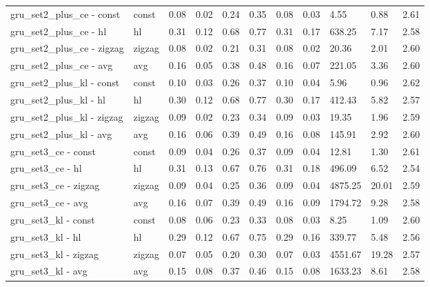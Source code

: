 \begin{longtable}{|p{1.3cm}|p{1.3cm}|p{1.3cm}|p{1.3cm}|p{1.3cm}|p{1.3cm}|p{1.3cm}|p{1.3cm}|p{1.3cm}|p{1.3cm}|p{1.3cm}|}
gru_set2_plus_ce - const & const & 0.08 & 0.02 & 0.24 & 0.35 & 0.08 & 0.03 & 4.55 & 0.88 & 2.61 \\
gru_set2_plus_ce - hl & hl & 0.31 & 0.12 & 0.68 & 0.77 & 0.31 & 0.17 & 638.25 & 7.17 & 2.58 \\
gru_set2_plus_ce - zigzag & zigzag & 0.08 & 0.02 & 0.21 & 0.31 & 0.08 & 0.02 & 20.36 & 2.01 & 2.60 \\
gru_set2_plus_ce - avg & avg & 0.16 & 0.05 & 0.38 & 0.48 & 0.16 & 0.07 & 221.05 & 3.36 & 2.60 \\
gru_set2_plus_kl - const & const & 0.10 & 0.03 & 0.26 & 0.37 & 0.10 & 0.04 & 5.96 & 0.96 & 2.62 \\
gru_set2_plus_kl - hl & hl & 0.30 & 0.12 & 0.68 & 0.77 & 0.30 & 0.17 & 412.43 & 5.82 & 2.57 \\
gru_set2_plus_kl - zigzag & zigzag & 0.09 & 0.02 & 0.23 & 0.34 & 0.09 & 0.03 & 19.35 & 1.96 & 2.59 \\
gru_set2_plus_kl - avg & avg & 0.16 & 0.06 & 0.39 & 0.49 & 0.16 & 0.08 & 145.91 & 2.92 & 2.60 \\
gru_set3_ce - const & const & 0.09 & 0.04 & 0.26 & 0.37 & 0.09 & 0.04 & 12.81 & 1.30 & 2.61 \\
gru_set3_ce - hl & hl & 0.31 & 0.13 & 0.67 & 0.76 & 0.31 & 0.18 & 496.09 & 6.52 & 2.54 \\
gru_set3_ce - zigzag & zigzag & 0.09 & 0.04 & 0.25 & 0.36 & 0.09 & 0.04 & 4875.25 & 20.01 & 2.59 \\
gru_set3_ce - avg & avg & 0.16 & 0.07 & 0.39 & 0.49 & 0.16 & 0.09 & 1794.72 & 9.28 & 2.58 \\
gru_set3_kl - const & const & 0.08 & 0.06 & 0.23 & 0.33 & 0.08 & 0.03 & 8.25 & 1.09 & 2.60 \\
gru_set3_kl - hl & hl & 0.29 & 0.12 & 0.67 & 0.75 & 0.29 & 0.16 & 339.77 & 5.48 & 2.56 \\
gru_set3_kl - zigzag & zigzag & 0.07 & 0.05 & 0.20 & 0.30 & 0.07 & 0.03 & 4551.67 & 19.28 & 2.57 \\
gru_set3_kl - avg & avg & 0.15 & 0.08 & 0.37 & 0.46 & 0.15 & 0.08 & 1633.23 & 8.61 & 2.58 \\
\hline
\end{longtable}